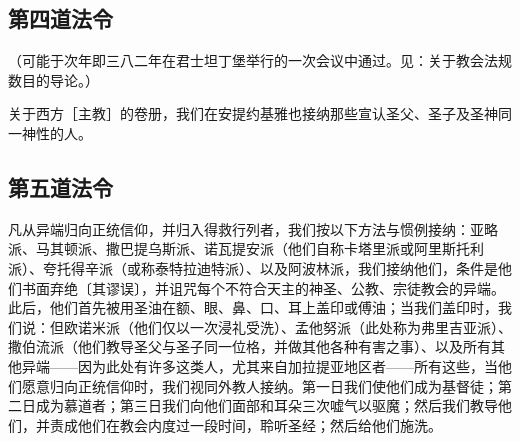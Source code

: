 
\subsection{第四道法令}

（可能于次年即三八二年在君士坦丁堡举行的一次会议中通过。见：关于教会法规数目的导论。）\par

关于西方［主教］的卷册，我们在安提约基雅也接纳那些宣认圣父、圣子及圣神同一神性的人。\par


\subsection{第五道法令}

凡从异端归向正统信仰，并归入得救行列者，我们按以下方法与惯例接纳：亚略派、马其顿派、撒巴提乌斯派、诺瓦提安派（他们自称卡塔里派或阿里斯托利派）、夸托得辛派（或称泰特拉迪特派）、以及阿波林派，我们接纳他们，条件是他们书面弃绝〔其谬误〕，并诅咒每个不符合天主的神圣、公教、宗徒教会的异端。此后，他们首先被用圣油在额、眼、鼻、口、耳上盖印或傅油；当我们盖印时，我们说：但欧诺米派（他们仅以一次浸礼受洗）、孟他努派（此处称为弗里吉亚派）、撒伯流派（他们教导圣父与圣子同一位格，并做其他各种有害之事）、以及所有其他异端——因为此处有许多这类人，尤其来自加拉提亚地区者——所有这些，当他们愿意归向正统信仰时，我们视同外教人接纳。第一日我们使他们成为基督徒；第二日成为慕道者；第三日我们向他们面部和耳朵三次嘘气以驱魔；然后我们教导他们，并责成他们在教会内度过一段时间，聆听圣经；然后给他们施洗。\par

